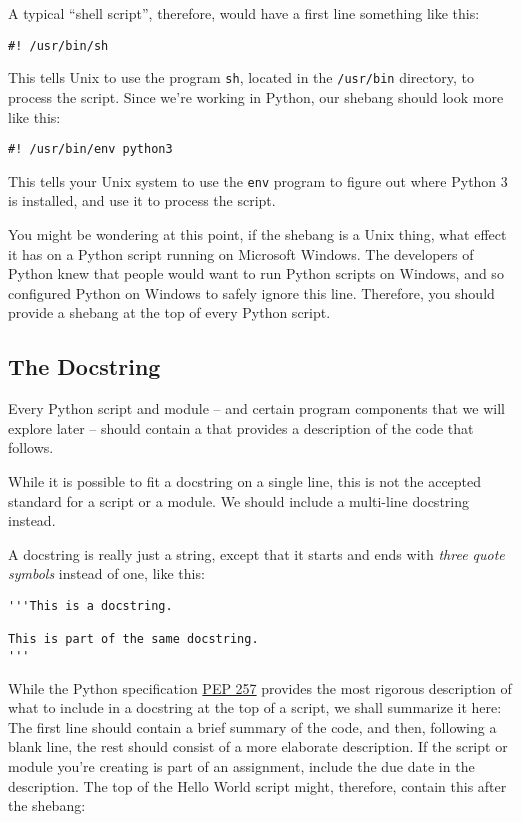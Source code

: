 A typical ``shell script'', therefore, would have a first line something like this:

\begin{verbatim}
#! /usr/bin/sh
\end{verbatim}

This tells Unix to use the program \texttt{sh}, located in the \texttt{/usr/bin} directory, to process the script.  Since we're working in Python, our shebang should look more like this:

\begin{verbatim}
#! /usr/bin/env python3
\end{verbatim}

This tells your Unix system to use the \texttt{env} program to figure out where Python 3 is installed, and use it to process the script.

You might be wondering at this point, if the shebang is a Unix thing, what effect it has on a Python script running on Microsoft Windows.  The developers of Python knew that people would want to run Python scripts on Windows, and so configured Python on Windows to safely ignore this line.  Therefore, you should provide a shebang at the top of every Python script.

\subsection{The Docstring}
\label{section:docstring}

Every Python script and module -- and certain program components that we will explore later -- should contain a  that provides a description of the code that follows.

While it is possible to fit a docstring on a single line, this is not the accepted standard for a script or a module.  We should include a multi-line docstring instead.

A docstring is really just a string, except that it starts and ends with \textit{three quote symbols} instead of one, like this:

\begin{verbatim}
'''This is a docstring.

This is part of the same docstring.
'''
\end{verbatim}

While the Python specification \href{https://www.python.org/dev/peps/pep-0257/#multi-line-docstrings}{PEP 257} provides the most rigorous description of what to include in a docstring at the top of a script, we shall summarize it here:  The first line should contain a brief summary of the code, and then, following a blank line, the rest should consist of a more elaborate description.  If the script or module you're creating is part of an assignment, include the due date in the description.  The top of the Hello World script might, therefore, contain this after the shebang:

